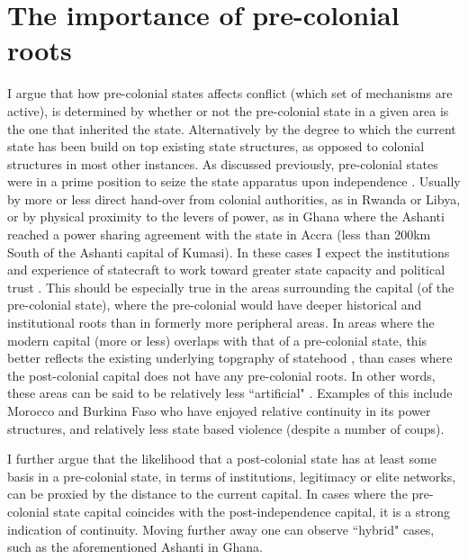 \documentclass[12pt]{article}
\begin{document}
\section{The importance of pre-colonial roots}

I argue that how pre-colonial states affects conflict (which set of mechanisms
are active), is determined by whether or not the pre-colonial state in a given
area is the one that inherited the state. Alternatively by the degree to which
the current state has been build on top existing state structures, as opposed to
colonial structures in most other instances. As discussed previously,
pre-colonial states were in a prime position to seize the state apparatus upon
independence \citep{Paine2019}. Usually by more or less direct hand-over from
colonial authorities, as in Rwanda or Libya, or by physical proximity to the
levers of power, as in Ghana where the Ashanti reached a power sharing agreement
with the state in Accra (less than 200km South of the Ashanti capital of
Kumasi). In these cases I expect the institutions and experience of statecraft
to work toward greater state capacity and political trust
\citep{Depetris-Chauvin2016}. This should be especially true in the areas
surrounding the capital (of the pre-colonial state), where the pre-colonial
would have deeper historical and institutional roots than in formerly more
peripheral areas. In areas where the modern capital (more or less) overlaps with
that of a pre-colonial state, this better reflects the existing underlying
topgraphy of statehood , than cases where the post-colonial capital does not
have any pre-colonial roots. In other words, these areas can be said to be
relatively less ``artificial" \citep{Alesina2011}. Examples of this include
Morocco and Burkina Faso who have enjoyed relative continuity in its power
structures, and relatively less state based violence (despite a number of
coups). 

I further argue that the likelihood that a post-colonial state has at least some
basis in a pre-colonial state, in terms of institutions, legitimacy or elite
networks, can be proxied by the distance to the current capital. In cases where
the pre-colonial state capital coincides with the post-independence capital, it
is a strong indication of continuity. Moving further away one can observe
``hybrid" cases, such as the aforementioned Ashanti in Ghana. 


\end{document}
